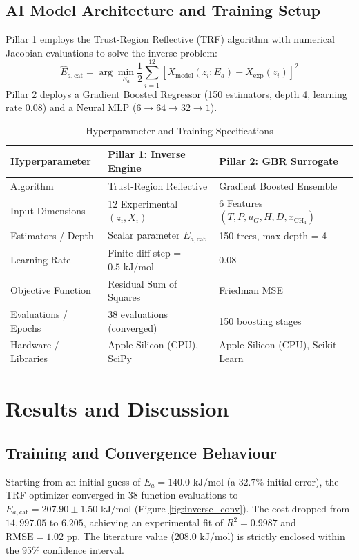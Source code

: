 \documentclass[12pt,a4paper,oneside]{report}
\begin{document}
\section{AI Model Architecture and Training Setup}
Pillar 1 employs the Trust-Region Reflective (TRF) algorithm with numerical Jacobian evaluations to solve the inverse problem:
\begin{equation}
\hat{E}_{a,\text{cat}} = \arg\min_{E_a} \frac{1}{2} \sum_{i=1}^{12} \left[ X_{\text{model}}(z_i; E_a) - X_{\text{exp}}(z_i) \right]^2
\end{equation}
Pillar 2 deploys a Gradient Boosted Regressor (150 estimators, depth 4, learning rate 0.08) and a Neural MLP ($6 \rightarrow 64 \rightarrow 32 \rightarrow 1$).

\begin{table}[ht]
\centering
\caption{Hyperparameter and Training Specifications}
\begin{tabular}{lll}
\toprule
\textbf{Hyperparameter} & \textbf{Pillar 1: Inverse Engine} & \textbf{Pillar 2: GBR Surrogate} \\
\midrule
Algorithm & Trust-Region Reflective & Gradient Boosted Ensemble \\
Input Dimensions & 12 Experimental $(z_i, X_i)$ & 6 Features $(T, P, u_G, H, D, x_{\text{CH}_4})$ \\
Estimators / Depth & Scalar parameter $E_{a,\text{cat}}$ & 150 trees, max depth = 4 \\
Learning Rate & Finite diff step = $0.5\text{ kJ/mol}$ & $0.08$ \\
Objective Function & Residual Sum of Squares & Friedman MSE \\
Evaluations / Epochs & 38 evaluations (converged) & 150 boosting stages \\
Hardware / Libraries & Apple Silicon (CPU), SciPy & Apple Silicon (CPU), Scikit-Learn \\
\bottomrule
\end{tabular}
\end{table}

\chapter{Results and Discussion}
\section{Training and Convergence Behaviour}
Starting from an initial guess of $E_a = 140.0\text{ kJ/mol}$ (a $32.7\%$ initial error), the TRF optimizer converged in 38 function evaluations to $E_{a,\text{cat}} = 207.90 \pm 1.50\text{ kJ/mol}$ (Figure \ref{fig:inverse_conv}). The cost dropped from $14,997.05$ to $6.205$, achieving an experimental fit of $R^2 = 0.9987$ and $\text{RMSE} = 1.02\text{ pp}$. The literature value ($208.0\text{ kJ/mol}$) is strictly enclosed within the 95\% confidence interval.
\end{document}
